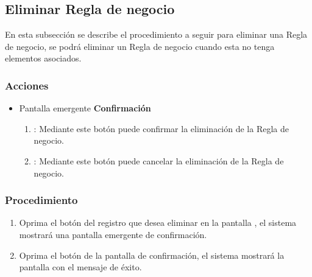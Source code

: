 \subsection{Eliminar Regla de negocio}

En esta subsección se describe el procedimiento a seguir para eliminar una Regla de negocio, se podrá eliminar un Regla de negocio cuando esta no tenga elementos asociados.

\subsubsection{Acciones}
\begin{itemize}
  \item Pantalla emergente \textbf{Confirmación}
  \begin{enumerate}
	\item {}: Mediante este botón puede confirmar la eliminación de la Regla de negocio.
	\item {}: Mediante este botón puede cancelar la eliminación de la Regla de negocio.
  \end{enumerate}
\end{itemize}

\subsubsection{Procedimiento}
\begin{enumerate}
	\item Oprima el botón \btnEliminar del registro que desea eliminar en la pantalla , el sistema mostrará una pantalla emergente de confirmación.
	
	\item Oprima el botón  de la pantalla de confirmación, el sistema mostrará la pantalla  con el mensaje de éxito.
\end{enumerate}

